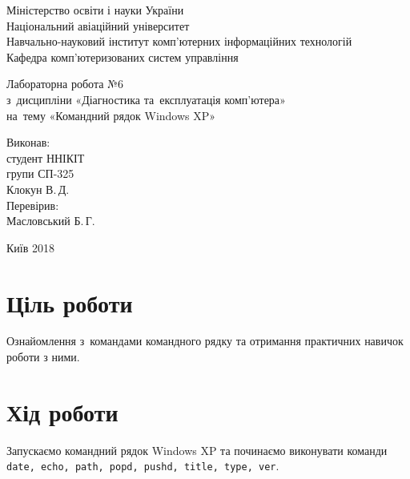 \documentclass[
	a4paper,
	oneside,
	DIV = 12,
	fontsize = 13pt,
	headings = normal,
]{scrartcl}
\newlength{\gridunitwidth}
\newcommand{\allcaps}[1]{{\addfontfeatures{LetterSpace = 5}#1}}
\newcommand{\progname}[1]{\texttt{#1}}
\begin{document}
\setlength{\gridunitwidth}{\textwidth / 12}
	\begin{titlepage}
		\begin{center}
			Міністерство освіти і науки України\\
			Національний авіаційний університет\\
			Навчально-науковий інститут комп'ютерних інформаційних технологій\\
			Кафедра комп'ютеризованих систем управління

			\vspace{\fill}
				Лабораторна робота №6\\
				з~дисципліни «Діагностика та~експлуатація комп'ютера»\\
				на~тему «Командний рядок \textenglish{Windows XP}»\\

			\vspace{\fill}

			\begin{flushright}
				Виконав:\\
				студент \allcaps{ННІКІТ}\\
				групи СП-325\\
				Клокун В.\,Д.\\
				Перевірив:\\
				Масловський Б.\,Г.
			\end{flushright}

			Київ 2018
		\end{center}
	\end{titlepage}

	\section{Ціль роботи}
		Ознайомлення з~командами командного рядку та отримання практичних навичок роботи з ними.


	\section{Хід роботи}
		Запускаємо командний рядок \textenglish{Windows XP} та починаємо виконувати команди \progname{date, echo, path, popd, pushd, title, type, ver}.
\end{document}
